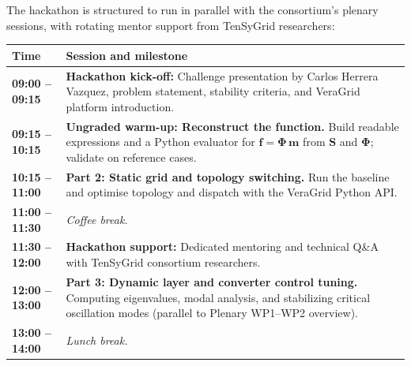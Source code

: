 \documentclass[11pt,a4paper]{article}
\begin{document}
The hackathon is structured to run in parallel with the consortium's plenary sessions, with rotating mentor support from TenSyGrid researchers:

\begin{table}[H]
  \centering
  \small
  \renewcommand{\arraystretch}{0.90}
  \begin{tabularx}{\textwidth}{lX}
    \toprule
    \textbf{\color{tgblue}Time} & \textbf{\color{tgblue}Session and milestone}                                                                                                                                                                                \\
    \midrule
    \textbf{09:00 -- 09:15}     & \textbf{Hackathon kick-off:} Challenge presentation by Carlos Herrera Vazquez, problem statement, stability criteria, and VeraGrid platform introduction.                                                                   \\
    \textbf{09:15 -- 10:15}     & \textbf{Ungraded warm-up: Reconstruct the function.} Build readable expressions and a Python evaluator for $\mathbf f=\boldsymbol{\Phi}\,\mathbf m$ from $\mathbf{S}$ and $\boldsymbol{\Phi}$; validate on reference cases. \\
    \textbf{10:15 -- 11:00}     & \textbf{Part 2: Static grid and topology switching.} Run the baseline and optimise topology and dispatch with the VeraGrid Python API.                                                                                      \\
    \textbf{11:00 -- 11:30}     & \textit{\color{tgpetrol}Coffee break.}                                                                                                                                                                                      \\
    \textbf{11:30 -- 12:00}     & \textbf{Hackathon support:} Dedicated mentoring and technical Q\&A with TenSyGrid consortium researchers.                                                                                                                   \\
    \textbf{12:00 -- 13:00}     & \textbf{Part 3: Dynamic layer and converter control tuning.} Computing eigenvalues, modal analysis, and stabilizing critical oscillation modes (parallel to Plenary WP1--WP2 overview).                                     \\
    \textbf{13:00 -- 14:00}     & \textit{\color{tgpetrol}Lunch break.}                                                                                                                                                                                       \\

\end{tabularx}
\end{table}
\end{document}

